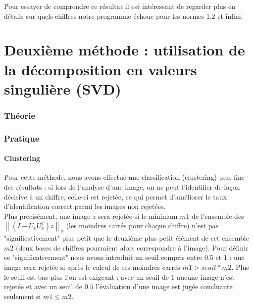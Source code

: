 \documentclass[a4paper,11pt,twoside]{report}
\newcommand{\norm}[1]{\left\lVert#1\right\rVert} %
\begin{document}
Pour essayer de comprendre ce résultat il est intéressant de regarder plus en détails sur quels chiffres notre programme échoue pour les normes 1,2 et infini.





\chapter{Deuxième méthode : utilisation de la décomposition en valeurs singulière (SVD)}
\subsection{Théorie}
\subsection{Pratique}
\subsubsection{Clustering}%
Pour cette méthode, nous avons effectué une classification (clustering) plus fine des résultats : si lors de l'analyse d'une image, on ne peut l'identifier de façon décisive à un chiffre, celle-ci est rejetée, ce qui permet d'améliorer le taux d'identification correct parmi les images non rejetées. \\
Plus précisément, une image $z$ sera rejetée si le minimum $m1$ de l'ensemble des $ \norm{(I-U_{k}U_{k}^{T})z}_{2}$ (les moindres carrés pour chaque chiffre) n'est pas "significativement" plus petit que le deuxième plus petit élément de cet ensemble $m2$ (deux bases de chiffres pourraient alors correspondre à l'image). Pour définir ce "significativement" nous avons introduit un seuil compris entre $0.5$ et $1$ : une image sera rejetée si après le calcul de ses moindres carrés $m1>seuil*m2$. Plus le seuil est bas plus l'on est exigeant : avec un seuil de $1$ aucune image n'est rejetée et avec un seuil de $0.5$ l'évaluation d'une image est jugée concluante seulement si $m1\leq m2$.\\
\end{document}
